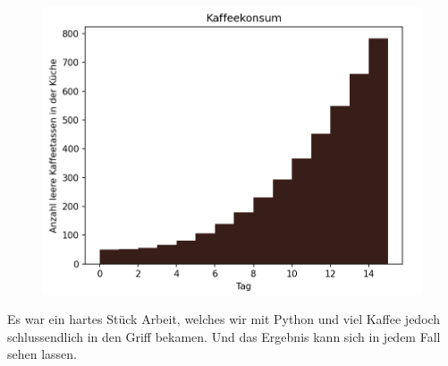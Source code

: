 \begin{figure}[htb]
    \centering
    \includegraphics{k4.2/kaffee.png}
    \label{k4.2.kaffe}
\end{figure}

Es war ein hartes Stück Arbeit, welches wir mit Python und viel Kaffee jedoch schlussendlich in den Griff bekamen. Und das Ergebnis kann sich in jedem Fall sehen lassen.
